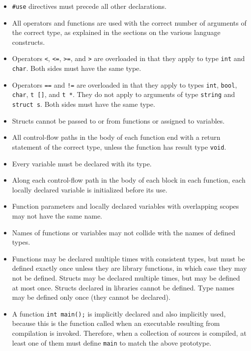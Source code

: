 \documentclass[11pt]{article}
\begin{document}
\begin{itemize}
\item \verb'#use' directives must precede all other
  declarations.
\item All operators and functions are used with the
  correct number of arguments of the correct type,
  as explained in the sections on the various language
  constructs.
\item Operators \verb'<', \verb'<=', \verb'>=', and
  \verb'>' are overloaded in that they apply to
  type \verb'int' and \verb'char'.  Both sides must
  have the same type.
\item Operators \verb'==' and \verb'!=' are overloaded
  in that they apply to types \verb'int', \verb'bool',
  \verb'char', \verb't []', and \verb't *'.  They do
  not apply to arguments of type \verb'string' and
  \verb'struct s'.  Both sides must have the same type.
\item Structs cannot be passed to or from functions
  or assigned to variables.
\item All control-flow paths in the body of each function
  end with a return statement of the correct type,
  unless the function has result type \verb'void'.
\item Every variable must be declared with its type.
\item Along each control-flow path in the body of each
  block in each function, each locally declared variable
  is initialized before its use.
\item Function parameters and locally declared variables
  with overlapping scopes may not have the same name.
\item Names of functions or variables may not collide with the names
  of defined types.
\item Functions may be declared multiple times with consistent
  types, but must be defined exactly once unless they are library
  functions, in which case they may not be defined.  Structs may
  be declared multiple times, but may be defined at most once.
  Structs declared in libraries cannot be defined.  Type names may
  be defined only once (they cannot be declared).
\item A function \verb'int main();' is implicitly declared and
  also implicitly used, because this is the function called
  when an executable resulting from compilation is invoked.
  Therefore, when a collection of sources is compiled, at
  least one of them must define \verb'main' to match the
  above prototype.


\end{itemize}
\end{document}
